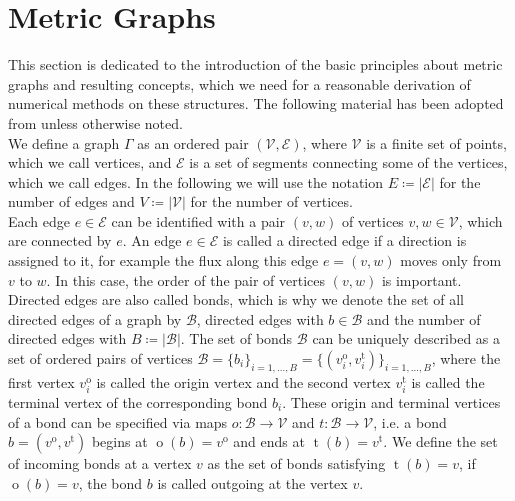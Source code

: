 \section{Metric Graphs}
\label{ch1:sec1}

This section is dedicated to the introduction of the basic principles about metric graphs and resulting concepts, which we need for a reasonable derivation of numerical methods on these structures. The following material has been adopted from \cite[chapter~1]{BerkolaikoKuchment:2013} unless otherwise noted. \\

We define a graph $\Gamma$ as an ordered pair $(\mathcal{V}, \mathcal{E})$, where $\mathcal{V}$ is a finite set of points, which we call vertices, and $\mathcal{E}$ is a set of segments connecting some of the vertices, which we call edges. In the following we will use the notation $E \coloneqq \left\lvert \mathcal{E} \right\rvert$ for the number of edges and $V \coloneqq \left\lvert \mathcal{V} \right\rvert$ for the number of vertices. \\
Each edge $e \in \mathcal{E}$ can be identified with a pair $(v, w)$ of vertices $v, w \in \mathcal{V}$, which are connected by $e$. An edge $e \in \mathcal{E}$ is called a directed edge if a direction is assigned to it, for example the flux along this edge $e = (v, w)$ moves only from $v$ to $w$. In this case, the order of the pair of vertices $(v, w)$ is important. Directed edges are also called bonds, which is why we denote the set of all directed edges of a graph by $\mathcal{B}$, directed edges with $b \in \mathcal{B}$ and the number of directed edges with $B \coloneqq \left\lvert \mathcal{B} \right\rvert$. The set of bonds $\mathcal{B}$ can be uniquely described as a set of ordered pairs of vertices $\mathcal{B} = \{b_i\}_{i = 1, \ldots, B} = \{(v^{\operatorname{o}}_{i}, v^{\operatorname{t}}_{i})\}_{i = 1, \ldots, B}$, where the first vertex $v^{\operatorname{o}}_{i}$ is called the origin vertex and the second vertex $v^{\operatorname{t}}_{i}$ is called the terminal vertex of the corresponding bond $b_i$. These origin and terminal vertices of a bond can be specified via maps $o \colon \mathcal{B} \to \mathcal{V}$ and $t \colon \mathcal{B} \to \mathcal{V}$, i.e. a bond $b = (v^{\operatorname{o}}, v^{\operatorname{t}})$ begins at $\operatorname{o}(b) = v^{\operatorname{o}}$ and ends at $\operatorname{t}(b) = v^{\operatorname{t}}$. We define the set of incoming bonds at a vertex $v$ as the set of bonds satisfying $\operatorname{t}(b) = v$, if $\operatorname{o}(b) = v$, the bond $b$ is called outgoing at the vertex $v$. \\
